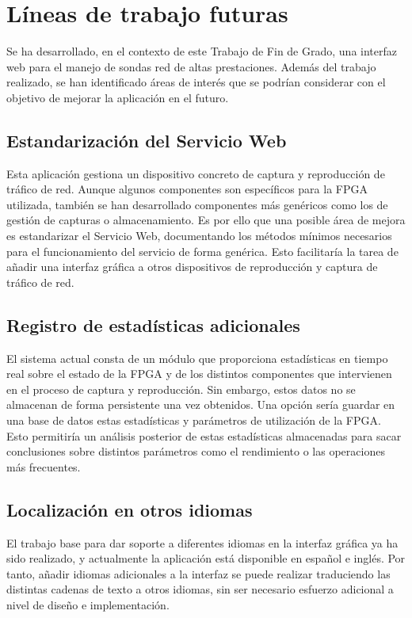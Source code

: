 \chapter{Líneas de trabajo futuras\label{cap:lineas_de_trabajo_futuras}}

Se ha desarrollado, en el contexto de este Trabajo de Fin de Grado, una interfaz web para el manejo de sondas red de altas prestaciones. Además del trabajo realizado, se han identificado áreas de interés que se podrían considerar con el objetivo de mejorar la aplicación en el futuro.


\section*{Estandarización del Servicio Web}

Esta aplicación gestiona un dispositivo concreto de captura y reproducción de tráfico de red. Aunque algunos componentes son específicos para la \gls{FPGA} utilizada, también se han desarrollado componentes más genéricos como los de gestión de capturas o almacenamiento. Es por ello que una posible área de mejora es estandarizar el Servicio Web, documentando los métodos mínimos necesarios para el funcionamiento del servicio de forma genérica. Esto facilitaría la tarea de añadir una interfaz gráfica a otros dispositivos de reproducción y captura de tráfico de red.


\section*{Registro de estadísticas adicionales}

El sistema actual consta de un módulo que proporciona estadísticas en tiempo real sobre el estado de la \gls{FPGA} y de los distintos componentes que intervienen en el proceso de captura y reproducción. Sin embargo, estos datos no se almacenan de forma persistente una vez obtenidos. Una opción sería guardar en una base de datos estas estadísticas y parámetros de utilización de la \gls{FPGA}. Esto permitiría un análisis posterior de estas estadísticas almacenadas para sacar conclusiones sobre distintos parámetros como el rendimiento o las operaciones más frecuentes.


\section*{Localización en otros idiomas}

El trabajo base para dar soporte a diferentes idiomas en la interfaz gráfica ya ha sido realizado, y actualmente la aplicación está disponible en español e inglés. Por tanto, añadir idiomas adicionales a la interfaz se puede realizar traduciendo las distintas cadenas de texto a otros idiomas, sin ser necesario esfuerzo adicional a nivel de diseño e implementación.



